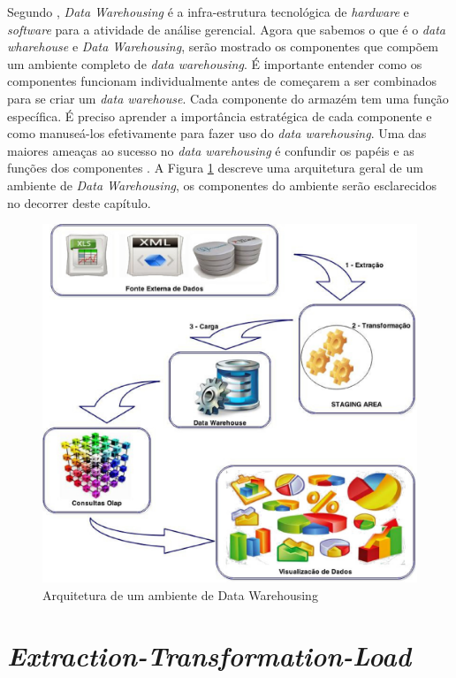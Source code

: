 Segundo ,  \textit{Data Warehousing} é a infra-estrutura tecnológica de \textit{hardware} e \textit{software} para a atividade de análise gerencial. Agora que sabemos o que é o \textit{data wharehouse} e \textit{Data Warehousing}, serão mostrado os componentes que compõem um ambiente completo de \textit{data warehousing}. É importante entender como os componentes funcionam individualmente antes de começarem a ser combinados para se criar um \textit{data warehouse}. Cada componente do armazém tem uma função específica. É preciso aprender a importância estratégica de cada componente e como manuseá-los efetivamente para fazer uso do \textit{data warehousing}. Uma das maiores ameaças ao sucesso no \textit{data warehousing} é confundir os papéis e as funções dos componentes \cite{Kimball2002}. A Figura \ref{fig:etl} descreve uma arquitetura geral de um ambiente de \textit{Data Warehousing}, os componentes do ambiente serão esclarecidos no decorrer deste capítulo.

\begin{figure}[h!]
\centering
\includegraphics[keepaspectratio=false,scale=0.50]{figuras/figuras_nilton/etl.eps}
\caption{Arquitetura de um ambiente de Data Warehousing}
\label{fig:etl}
\end{figure}
\FloatBarrier


\section{\textit{Extraction-Transformation-Load}}

